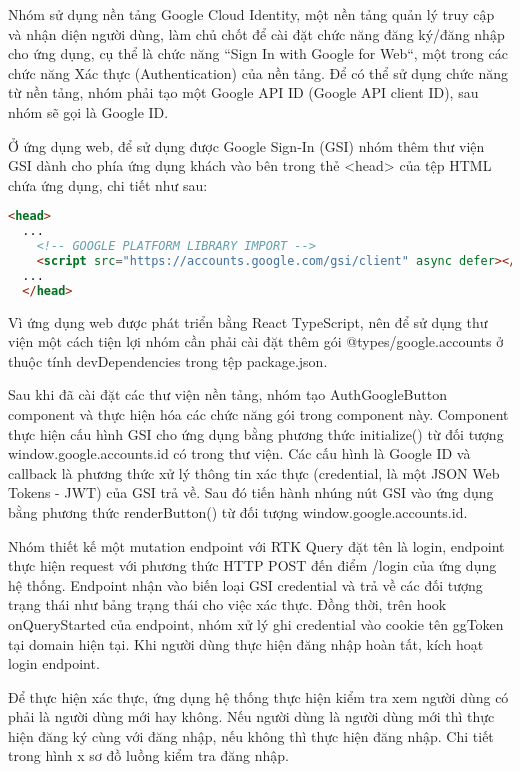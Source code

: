 \tab Nhóm sử dụng nền tảng Google Cloud Identity, một nền tảng quản lý truy cập và nhận diện người dùng, làm chủ chốt để cài đặt chức năng đăng ký/đăng nhập cho ứng dụng, cụ thể là chức năng “Sign In with Google for Web“, một trong các chức năng Xác thực (Authentication) của nền tảng. Để có thể sử dụng chức năng từ nền tảng, nhóm phải tạo một Google API ID (Google API client ID), sau nhóm sẽ gọi là Google ID.
\par

Ở ứng dụng web, để sử dụng được Google Sign-In (GSI) nhóm thêm thư viện GSI dành cho phía ứng dụng khách vào bên trong thẻ <head> của tệp HTML chứa ứng dụng, chi tiết như sau:  
\par

\lstset{style=mystyle}
\begin{lstlisting}[language=HTML, caption=HTML example]
  <head>
  ...
    <!-- GOOGLE PLATFORM LIBRARY IMPORT -->
    <script src="https://accounts.google.com/gsi/client" async defer></script>
  ...
  </head>
\end{lstlisting}

Vì ứng dụng web được phát triển bằng React TypeScript, nên để sử dụng thư viện một cách tiện lợi nhóm cần phải cài đặt thêm gói @types/google.accounts ở thuộc tính devDependencies trong tệp package.json.

Sau khi đã cài đặt các thư viện nền tảng, nhóm tạo AuthGoogleButton component và thực hiện hóa các chức năng gói trong component này. Component thực hiện cấu hình GSI cho ứng dụng bằng phương thức initialize() từ đối tượng window.google.accounts.id có trong thư viện. Các cấu hình là Google ID và callback là phương thức xử lý thông tin xác thực (credential, là một JSON Web Tokens - JWT) của GSI trả về. Sau đó tiến hành nhúng nút GSI vào ứng dụng bằng phương thức renderButton() từ đối tượng window.google.accounts.id.

Nhóm thiết kế một mutation endpoint với RTK Query đặt tên là login, endpoint thực hiện request với phương thức HTTP POST đến điểm /login của ứng dụng hệ thống. Endpoint nhận vào biến loại GSI credential và trả về các đối tượng trạng thái như bảng trạng thái cho việc xác thực. Đồng thời, trên hook onQueryStarted của endpoint, nhóm xử lý ghi credential vào cookie tên ggToken tại domain hiện tại. Khi người dùng thực hiện đăng nhập hoàn tất, kích hoạt login endpoint.

Để thực hiện xác thực, ứng dụng hệ thống thực hiện kiểm tra xem người dùng có phải là người dùng mới hay không. Nếu người dùng là người dùng mới thì thực hiện đăng ký cùng với đăng nhập, nếu không thì thực hiện đăng nhập. Chi tiết trong hình x sơ đồ luồng kiểm tra đăng nhập.


